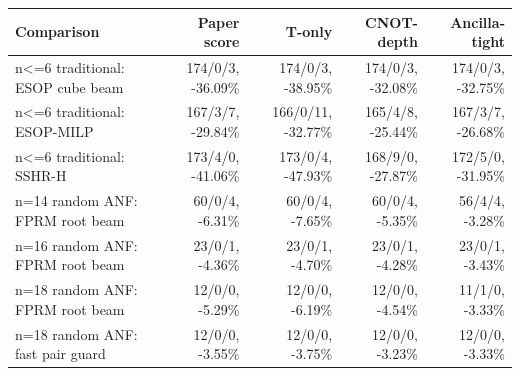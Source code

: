 \begin{tabularx}{\linewidth}{>{\raggedright\arraybackslash}Xrrrr}
\toprule
Comparison & Paper score & T-only & CNOT-depth & Ancilla-tight \\
\midrule
n<=6 traditional: ESOP cube beam & 174/0/3, -36.09\% & 174/0/3, -38.95\% & 174/0/3, -32.08\% & 174/0/3, -32.75\% \\
n<=6 traditional: ESOP-MILP & 167/3/7, -29.84\% & 166/0/11, -32.77\% & 165/4/8, -25.44\% & 167/3/7, -26.68\% \\
n<=6 traditional: SSHR-H & 173/4/0, -41.06\% & 173/0/4, -47.93\% & 168/9/0, -27.87\% & 172/5/0, -31.95\% \\
n=14 random ANF: FPRM root beam & 60/0/4, -6.31\% & 60/0/4, -7.65\% & 60/0/4, -5.35\% & 56/4/4, -3.28\% \\
n=16 random ANF: FPRM root beam & 23/0/1, -4.36\% & 23/0/1, -4.70\% & 23/0/1, -4.28\% & 23/0/1, -3.43\% \\
n=18 random ANF: FPRM root beam & 12/0/0, -5.29\% & 12/0/0, -6.19\% & 12/0/0, -4.54\% & 11/1/0, -3.33\% \\
n=18 random ANF: fast pair guard & 12/0/0, -3.55\% & 12/0/0, -3.75\% & 12/0/0, -3.23\% & 12/0/0, -3.33\% \\
\bottomrule
\end{tabularx}
